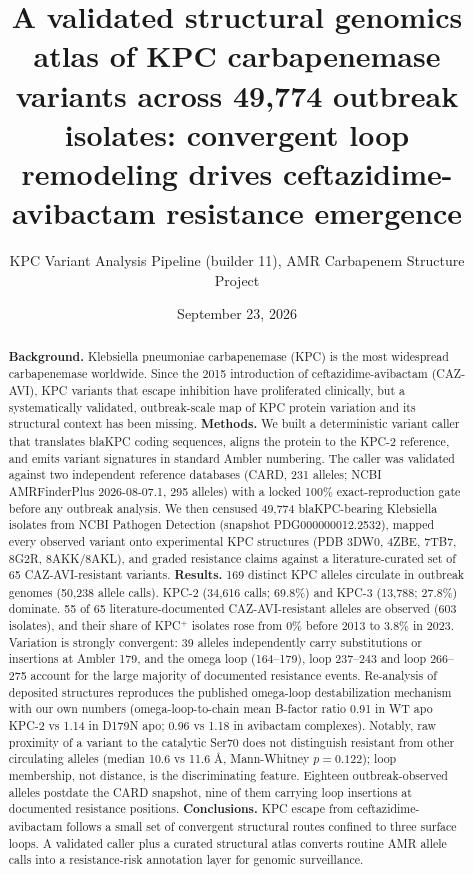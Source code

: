 \documentclass[11pt]{article}
\title{\textbf{A validated structural genomics atlas of KPC carbapenemase variants across 49,774 outbreak isolates: convergent loop remodeling drives ceftazidime-avibactam resistance emergence}}
\author{KPC Variant Analysis Pipeline (builder 11), AMR Carbapenem Structure Project}
\date{September 23, 2026}
\begin{document}
\maketitle
\begin{abstract}
\textbf{Background.} Klebsiella pneumoniae carbapenemase (KPC) is the most widespread carbapenemase worldwide. Since the 2015 introduction of ceftazidime-avibactam (CAZ-AVI), KPC variants that escape inhibition have proliferated clinically, but a systematically validated, outbreak-scale map of KPC protein variation and its structural context has been missing.
\textbf{Methods.} We built a deterministic variant caller that translates blaKPC coding sequences, aligns the protein to the KPC-2 reference, and emits variant signatures in standard Ambler numbering. The caller was validated against two independent reference databases (CARD, 231 alleles; NCBI AMRFinderPlus 2026-08-07.1, 295 alleles) with a locked 100\% exact-reproduction gate before any outbreak analysis. We then censused 49,774 blaKPC-bearing Klebsiella isolates from NCBI Pathogen Detection (snapshot PDG000000012.2532), mapped every observed variant onto experimental KPC structures (PDB 3DW0, 4ZBE, 7TB7, 8G2R, 8AKK/8AKL), and graded resistance claims against a literature-curated set of 65 CAZ-AVI-resistant variants.
\textbf{Results.} 169 distinct KPC alleles circulate in outbreak genomes (50,238 allele calls). KPC-2 (34,616 calls; 69.8\%) and KPC-3 (13,788; 27.8\%) dominate. 55 of 65 literature-documented CAZ-AVI-resistant alleles are observed (603 isolates), and their share of KPC$^+$ isolates rose from 0\% before 2013 to 3.8\% in 2023. Variation is strongly convergent: 39 alleles independently carry substitutions or insertions at Ambler 179, and the omega loop (164--179), loop 237--243 and loop 266--275 account for the large majority of documented resistance events. Re-analysis of deposited structures reproduces the published omega-loop destabilization mechanism with our own numbers (omega-loop-to-chain mean B-factor ratio 0.91 in WT apo KPC-2 vs 1.14 in D179N apo; 0.96 vs 1.18 in avibactam complexes). Notably, raw proximity of a variant to the catalytic Ser70 does not distinguish resistant from other circulating alleles (median 10.6 vs 11.6 \AA, Mann-Whitney $p=0.122$); loop membership, not distance, is the discriminating feature. Eighteen outbreak-observed alleles postdate the CARD snapshot, nine of them carrying loop insertions at documented resistance positions.
\textbf{Conclusions.} KPC escape from ceftazidime-avibactam follows a small set of convergent structural routes confined to three surface loops. A validated caller plus a curated structural atlas converts routine AMR allele calls into a resistance-risk annotation layer for genomic surveillance.
\end{abstract}
\end{document}
